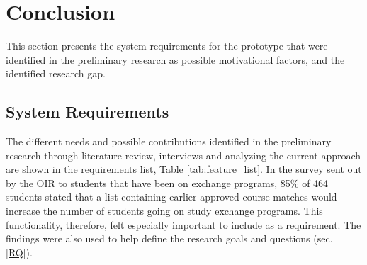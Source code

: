 \section{Conclusion}

This section presents the system requirements for the prototype that were identified in the preliminary research as possible motivational factors, and the identified research gap.

\subsection{System Requirements}\label{sec:requirements}

The different needs and possible contributions identified in the preliminary research through literature review, interviews and analyzing the current approach are shown in the requirements list, Table \ref{tab:feature_list}. In the survey \cite{intersek_report} sent out by the OIR to students that have been on exchange programs, 85\% of 464 students stated that a list containing earlier approved course matches would increase the number of students going on study exchange programs. This functionality, therefore, felt especially important to include as a requirement. The findings were also used to help define the research goals and questions (sec. \ref{RQ}). 

